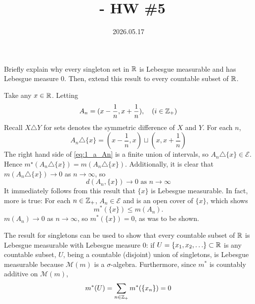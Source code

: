 \documentclass[12pt]{article}
\title{\course\ - HW \#5}
\author{\myname}
\date{2026.05.17}
\begin{document}
\maketitle
\thispagestyle{fancy}

\newcommand{\M}{\mathcal{M}}
\newcommand{\scrC}{\mathscr{C}}
\newcommand{\sigalg}[1]{\sigma\text{-alg}(#1)}

\section{} 
\subsection{}
Briefly explain why every singleton set in $\mathbb{R}$ is Lebesgue measurable and has Lebesgue measure 0. 
Then, extend this result to every countable subset of $\mathbb{R}$. 

\noindent\dotfill 

Take any $x \in \mathbb{R}$. 
Letting 
$$A_n = (x - \frac{1}{n}, x + \frac{1}{n}), \quad (i \in \mathbb{Z}_{+})$$
Recall $X \triangle Y$ for sets denotes the symmetric difference of $X$ and $Y$. 
For each $n$, 
\begin{equation} \label{eq:1_a_An}
  A_n \triangle \{x\} = (x - \frac{1}{n}, x) \sqcup (x, x + \frac{1}{n})
\end{equation}
The right hand side of \eqref{eq:1_a_An} is a finite union of intervals, so $A_n \triangle \{x\} \in \mathscr{E}$. 
Hence $m^{\star} (A_n \triangle \{x\}) = m(A_n \triangle \{x\})$. 
Additionally, it is clear that $m(A_n \triangle \{x\}) \rightarrow 0$ as $n \rightarrow \infty$, so
$$d(A_n, \{x\}) \rightarrow 0 \text{ as } n \rightarrow \infty$$
It immediately follows from this result that $\{x\}$ is Lebesgue measurable. 
In fact, more is true: 
For each $n \in \mathbb{Z}_{+}$, $A_n \in \mathscr{E}$ and is an open cover of $\{x\}$, which shows 
$$m^{*}(\{x\}) \leq m(A_n).$$
$m(A_n) \rightarrow 0$ as $n \rightarrow \infty$, so $m^{*} (\{x\}) = 0$, as was to be shown. 

The result for singletons can be used to show that every countable subset of $\mathbb{R}$ is Lebesgue measurable with Lebesgue measure 0:
if $U = \{x_1, x_2, \ldots\} \subset \mathbb{R}$ is any countable subset, $U$, being a countable (disjoint) union of singletons, is Lebesgue measurable because $\mathscr{M}(m)$ is a $\sigma$-algebra. 
Furthermore, since $m^{*}$ is countably additive on $\mathscr{M}(m)$, 
$$m^{*}(U) = \sum_{n \in \mathbb{Z}_{+}} m^{*} (\{x_n\}) = 0$$
\end{document}
